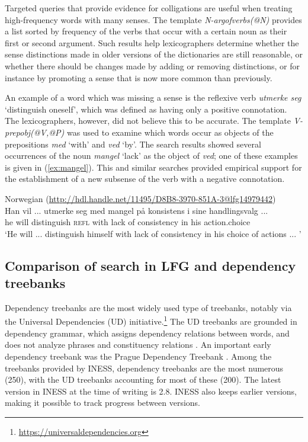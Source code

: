 \documentclass[output=paper,hidelinks]{langscibook}
\begin{document}
\newpage
Targeted queries that provide evidence for colligations are useful when treating high-frequency words with many senses.
The template \textit{N-argofverbs(@N)} provides a list sorted by frequency of the verbs that occur with a certain noun as their first or second argument.
Such results help lexicographers determine whether the sense distinctions made in older versions of the dictionaries are still reasonable, or whether there should be changes made by adding or removing distinctions, or for instance by promoting a sense that is now more common than previously.

An example of a word which was missing a sense is the reflexive verb \textit{utmerke seg} `distinguish oneself', which was defined as having only a positive connotation.
The lexicographers, however, did not believe this to be accurate.
The template \textit{V-prepobj(@V,@P)} was used to examine which words occur as objects of the prepositions \textit{med} `with' and \textit{ved} `by'.
The search results showed several occurrences of the noun \textit{mangel} `lack' as the object of \textit{ved}; one of these examples is given in (\ref{ex:mangel}).
This and similar searches provided empirical support for the establishment of a new subsense of the verb with a negative connotation.

\ea Norwegian (\url{http://hdl.handle.net/11495/D8B8-3970-851A-3@lfg14979442}) \\
\gll Han vil ... utmerke seg med mangel på konsistens i sine handlingsvalg ...\\  
     he will {} distinguish \textsc{refl} with lack of consistency in his {action.choice}\\ 
\glt `He will ... distinguish himself with lack of consistency in his choice of actions ... '
\label{ex:mangel}
\z

\subsection{Comparison of search in LFG and dependency treebanks}\label{comparison}

Dependency treebanks are the most widely used type of treebanks, notably
via the Universal Dependencies (UD) initiative.\footnote{\url{https://universaldependencies.org}}
The UD treebanks are grounded in dependency grammar, which assigns dependency relations between words, and does not analyze phrases and constituency relations \citep{Tesniere1959}.
An important early dependency treebank was the Prague Dependency Treebank \citep{Hajic01}.
Among the treebanks provided by INESS, dependency treebanks are the most numerous (250), with the UD treebanks accounting for most of these (200).
The latest version in INESS at the time of writing is 2.8. INESS also keeps earlier versions, making it possible to track progress between versions.
\end{document}

